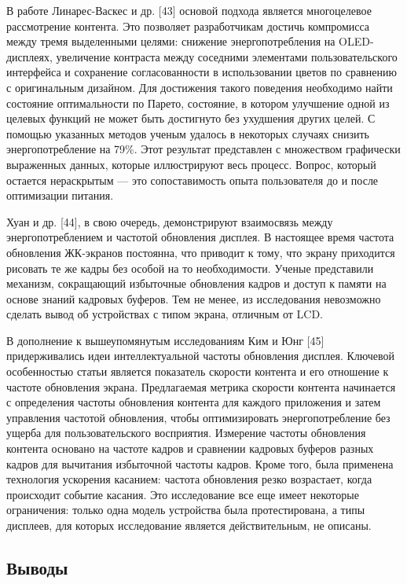 \documentclass[a4paper,14pt]{extarticle} %
\begin{document}
	В работе Линарес-Васкес и др. [43] основой подхода является многоцелевое рассмотрение контента. Это позволяет разработчикам достичь компромисса между тремя выделенными целями: снижение энергопотребления на OLED-дисплеях, увеличение контраста между соседними элементами пользовательского интерфейса и сохранение согласованности в использовании цветов по сравнению с оригинальным дизайном. Для достижения такого поведения необходимо найти состояние оптимальности по Парето, состояние, в котором улучшение одной из целевых функций не может быть достигнуто без ухудшения других целей. С помощью указанных методов ученым удалось в некоторых случаях снизить энергопотребление на 79\%. Этот результат представлен с множеством графически выраженных данных, которые иллюстрируют весь процесс. Вопрос, который остается нераскрытым — это сопоставимость опыта пользователя до и после оптимизации питания.
	
	Хуан и др. [44], в свою очередь, демонстрируют взаимосвязь между энергопотреблением и частотой обновления дисплея. В настоящее время частота обновления ЖК-экранов постоянна, что приводит к тому, что экрану приходится рисовать те же кадры без особой на то необходимости. Ученые представили механизм, сокращающий избыточные обновления кадров и доступ к памяти на основе знаний кадровых буферов. Тем не менее, из исследования невозможно сделать вывод об устройствах с типом экрана, отличным от LCD.
	
	В дополнение к вышеупомянутым исследованиям Ким и Юнг [45] придерживались идеи интеллектуальной частоты обновления дисплея. Ключевой особенностью статьи является показатель скорости контента и его отношение к частоте обновления экрана. Предлагаемая метрика скорости контента начинается с определения частоты обновления контента для каждого приложения и затем управления частотой обновления, чтобы оптимизировать энергопотребление без ущерба для пользовательского восприятия. Измерение частоты обновления контента основано на частоте кадров и сравнении кадровых буферов разных кадров для вычитания избыточной частоты кадров. Кроме того, была применена технология ускорения касанием: частота обновления резко возрастает, когда происходит событие касания. Это исследование все еще имеет некоторые ограничения: только одна модель устройства была протестирована, а типы дисплеев, для которых исследование является действительным, не описаны.
	
	\subsection{Выводы}
	
\end{document}
